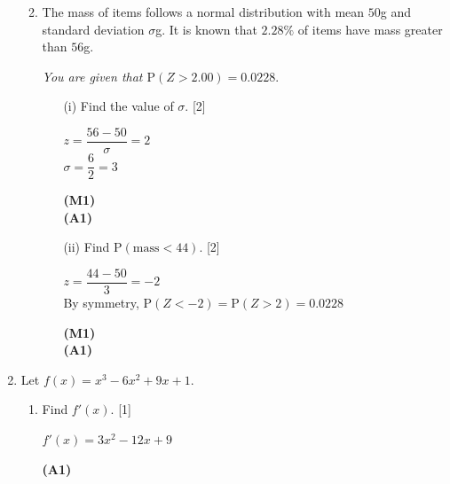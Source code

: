 \documentclass[12pt, twoside]{article}
\begin{document}
\begin{enumerate}[itemsep=0.2cm]
\begin{enumerate}[itemsep=0.3cm]
  \medskip
  \item The mass of items follows a normal distribution with mean $50$\;g
        and standard deviation $\sigma$\;g. It is known that $2.28\%$ of items
        have mass greater than $56$\;g.

        \emph{You are given that $\mathrm{P}(Z > 2.00) = 0.0228$}.
  \begin{enumerate}[itemsep=0.2cm]
    \item[(i)] Find the value of $\sigma$. \hfill [2]

    \begin{minipage}[t]{0.62\textwidth}
    $z = \dfrac{56 - 50}{\sigma} = 2$\\[0.3cm]
    $\sigma = \dfrac{6}{2} = 3$
    \end{minipage}%
    \begin{minipage}[t]{0.35\textwidth}\raggedleft
    \textbf{(M1)}\\[0.3cm]
    \textbf{(A1)}
    \end{minipage}

    \medskip
    \item[(ii)] Find $\mathrm{P}(\text{mass} < 44)$. \hfill [2]

    \begin{minipage}[t]{0.62\textwidth}
    $z = \dfrac{44 - 50}{3} = -2$\\[0.15cm]
    By symmetry, $\mathrm{P}(Z < -2) = \mathrm{P}(Z > 2) = 0.0228$
    \end{minipage}%
    \begin{minipage}[t]{0.35\textwidth}\raggedleft
    \textbf{(M1)}\\[0.15cm]
    \textbf{(A1)}
    \end{minipage}
  \end{enumerate}
\end{enumerate}

\newpage

\item Let $f(x) = x^3 - 6x^2 + 9x + 1$.

\begin{enumerate}[itemsep=0.3cm]
  \item Find $f'(x)$. \hfill [1]

  \begin{minipage}[t]{0.62\textwidth}
  $f'(x) = 3x^2 - 12x + 9$
  \end{minipage}%
  \begin{minipage}[t]{0.35\textwidth}\raggedleft
  \textbf{(A1)}
  \end{minipage}


\end{enumerate}
\end{enumerate}
\end{document}
